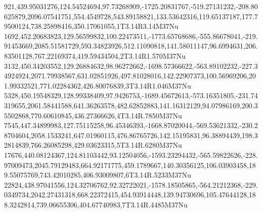 921,439.95031276,124.54524694,97.73268909,-1725.20831767,-519.27131232,-208.80625879,2096.07541751,554.4549728,543.89158821,133.53642316,119.65137187,177.79500124,738.25898416,350.17061055,1T3.14R3.14M37Nu
1692,452.20683823,129.56599832,100.22473511,-1773.65768686,-555.86678041,-219.91453669,2085.51581729,593.34823926,512.11090818,141.58011147,96.6994631,206.83501128,767.22169374,419.59434504,2T3.14R1.570M37Nu
3132,450.34203552,129.26884632,98.96272662,-1698.57366622,-563.89102232,-227.34924924,2071.79938567,631.02851926,497.81028016,142.22907373,100.56969206,201.99332521,771.02284362,426.80076839,3T3.14R1.046M37Nu
5328,450.19548329,128.99338409,97.9426753,-1689.45672613,-573.16351805,-231.74319655,2061.58441588,641.36263578,482.62852883,141.16312129,94.07986169,200.35502868,770.60610845,436.27366626,4T3.14R.7850M37Nu
7545,447.34899983,127.75115258,96.45346393,-1668.87020044,-569.53621332,-230.28704604,2058.1533241,647.01960115,476.86765726,142.15195831,96.38894439,198.32814839,766.26085298,429.03623315,5T3.14R.6280M37Nu
17676,440.08124367,124.81103442,93.12504056,-1593.23294432,-565.59822626,-228.97009473,2045.79129483,664.92171775,459.1789667,140.30356125,106.03903458,189.55075769,743.42010285,406.93009807,6T3.14R.5233M37Nu
22824,438.97041556,124.32706762,92.32722021,-1578.18505865,-564.21212368,-229.0349734,2042.27431318,668.22372415,454.93914448,139.94730696,105.47644128,188.3242814,739.06655306,404.67740983,7T3.14R.4485M37Nu
